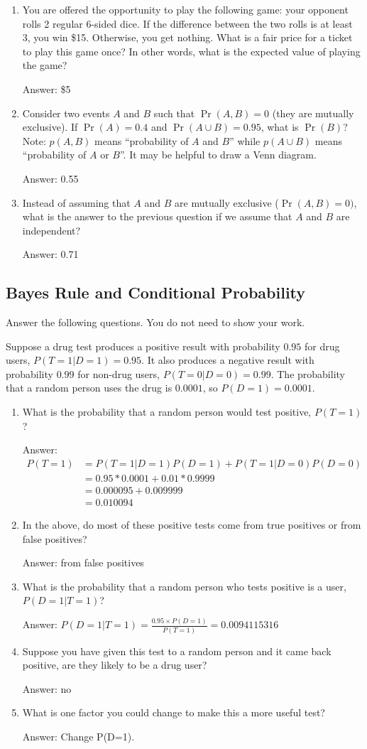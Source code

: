 \documentclass{article}
\def\ans#1{\par\gre{Answer: #1}}
\def\blu#1{{\color{blu}#1}}
\def\gre#1{{\color{gre}#1}}
\begin{document}
\begin{enumerate}
\item You are offered the opportunity to play the following game: your opponent rolls 2 regular 6-sided dice. If the difference between the two rolls is at least 3, you win \$15. Otherwise, you get nothing. What is a fair price for a ticket to play this game once? In other words, what is the expected value of playing the game?
\ans{\$5}
\item Consider two events $A$ and $B$ such that $\Pr(A, B)=0$ (they are mutually exclusive). If $\Pr(A) = 0.4$ and $\Pr(A \cup B) = 0.95$, what is $\Pr(B)$? Note: $p(A, B)$ means
``probability of $A$ and $B$'' while $p(A \cup B)$ means ``probability of $A$ or $B$''. It may be helpful to draw a Venn diagram.
\ans{0.55}
\item Instead of assuming that $A$ and $B$ are mutually exclusive ($\Pr(A,B) = 0)$, what is the answer to the previous question if we assume that $A$ and $B$ are independent?
\ans{0.71}
\end{enumerate}

\subsection{Bayes Rule and Conditional Probability}

\blu{Answer the following questions.} You do not need to show your work.

Suppose a drug test produces a positive result with probability $0.95$ for drug users, $P(T=1|D=1)=0.95$. It also produces a negative result with probability $0.99$ for non-drug users, $P(T=0|D=0)=0.99$. The probability that a random person uses the drug is $0.0001$, so $P(D=1)=0.0001$. 

\begin{enumerate}
\item What is the probability that a random person would test positive, $P(T=1)$?
\ans{\begin{align*}P(T=1) &= P(T=1|D=1)P(D=1) + P(T=1|D=0)P(D=0)\\ &= 0.95*0.0001 + 0.01*0.9999 \\ &= 0.000095 + 0.009999 \\ &= 0.010094 \end{align*}}
\item In the above, do most of these positive tests come from true positives or from false positives? 
\ans{from false positives}
\item What is the probability that a random person who tests positive is a user, $P(D=1|T=1)$?
\ans{$P(D=1|T=1) = \frac{0.95\times P(D=1)}{P(T=1)} = 0.0094115316$}
\item Suppose you have given this test to a random person and it came back positive, are they likely to be a drug user?
\ans{no}
\item What is one factor you could change to make this a more useful test?
\ans{Change P(D=1).}
\end{enumerate}
\end{document}
